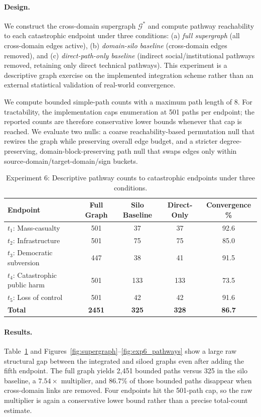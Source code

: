 \documentclass[11pt]{article}
\begin{document}
\paragraph{Design.} We construct the cross-domain supergraph $\mathcal{G}^*$ and compute pathway reachability to each catastrophic endpoint under three conditions: (a) \textit{full supergraph} (all cross-domain edges active), (b) \textit{domain-silo baseline} (cross-domain edges removed), and (c) \textit{direct-path-only baseline} (indirect social/institutional pathways removed, retaining only direct technical pathways). This experiment is a descriptive graph exercise on the implemented integration scheme rather than an external statistical validation of real-world convergence.

We compute bounded simple-path counts with a maximum path length of 8. For tractability, the implementation caps enumeration at 501 paths per endpoint; the reported counts are therefore conservative lower bounds whenever that cap is reached. We evaluate two nulls: a coarse reachability-based permutation null that rewires the graph while preserving overall edge budget, and a stricter degree-preserving, domain-block-preserving path null that swaps edges only within source-domain/target-domain/sign buckets.

\begin{table}[t]
\centering
\caption{Experiment 6: Descriptive pathway counts to catastrophic endpoints under three conditions.}
\label{tab:exp6}
\small
\begin{tabular}{@{}lcccc@{}}
\toprule
\textbf{Endpoint} & \textbf{Full Graph} & \textbf{Silo Baseline} & \textbf{Direct-Only} & \textbf{Convergence \%} \\
\midrule
$t_1$: Mass-casualty & 501 & 37 & 37 & 92.6 \\
$t_2$: Infrastructure & 501 & 75 & 75 & 85.0 \\
$t_3$: Democratic subversion & 447 & 38 & 41 & 91.5 \\
$t_4$: Catastrophic public harm & 501 & 133 & 133 & 73.5 \\
$t_5$: Loss of control & 501 & 42 & 42 & 91.6 \\
\midrule
\textbf{Total} & \textbf{2451} & \textbf{325} & \textbf{328} & \textbf{86.7} \\
\bottomrule
\end{tabular}
\end{table}

\begingroup
\sloppy
\paragraph{Results.} Table~\ref{tab:exp6} and Figures~\ref{fig:supergraph}--\ref{fig:exp6_pathways} show a large raw structural gap between the integrated and siloed graphs even after adding the fifth endpoint. The full graph yields 2,451 bounded paths versus 325 in the silo baseline, a $7.54\times$ multiplier, and 86.7\% of those bounded paths disappear when cross-domain links are removed. Four endpoints hit the 501-path cap, so the raw multiplier is again a conservative lower bound rather than a precise total-count estimate.
\end{document}
